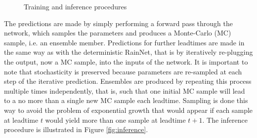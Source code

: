 \begin{figure}[ht]
	\begin{center}
		\caption{Training and inference procedures}
		\label{fig:training_inference_diagram}
	\end{center}
\end{figure}

The predictions are made by simply performing a forward pass through the network, which samples the parameters and produces a Monte-Carlo (MC) sample, i.e. an ensemble member. Predictions for further leadtimes are made in the same way as with the deterministic RainNet, that is by iteratively re-plugging the output, now a MC sample, into the inputs of the network. It is important to note that stochasticity is preserved because parameters are re-sampled at each step of the iterative prediction. Ensembles are produced by repeating this process multiple times independently, that is, such that one initial MC sample will lead to a no more than a single new MC sample each leadtime. Sampling is done this way to avoid the problem of exponential growth that would appear if each sample at leadtime $t$ would yield more than one sample at leadtime $t+1$. The inference procedure is illustrated in Figure \ref{fig:inference}.

